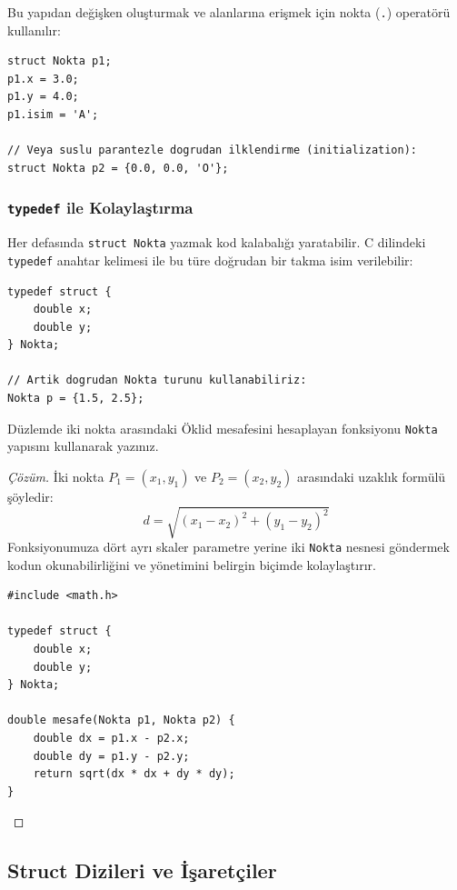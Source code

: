 Bu yapıdan değişken oluşturmak ve alanlarına erişmek için nokta (\lstinline|.|) operatörü kullanılır:
\begin{lstlisting}[language=CTemel]
struct Nokta p1;
p1.x = 3.0;
p1.y = 4.0;
p1.isim = 'A';

// Veya suslu parantezle dogrudan ilklendirme (initialization):
struct Nokta p2 = {0.0, 0.0, 'O'};
\end{lstlisting}

\subsubsection{\lstinline|typedef| ile Kolaylaştırma}
Her defasında \lstinline|struct Nokta| yazmak kod kalabalığı yaratabilir. C dilindeki \lstinline|typedef| anahtar kelimesi ile bu türe doğrudan bir takma isim verilebilir:
\begin{lstlisting}[language=CTemel]
typedef struct {
    double x;
    double y;
} Nokta;

// Artik dogrudan Nokta turunu kullanabiliriz:
Nokta p = {1.5, 2.5};
\end{lstlisting}

\begin{example}
Düzlemde iki nokta arasındaki Öklid mesafesini hesaplayan fonksiyonu \lstinline|Nokta| yapısını kullanarak yazınız.
\end{example}

\begin{proof}[Çözüm]
İki nokta $P_1 = (x_1, y_1)$ ve $P_2 = (x_2, y_2)$ arasındaki uzaklık formülü şöyledir:
\[
d = \sqrt{(x_1 - x_2)^2 + (y_1 - y_2)^2}
\]
Fonksiyonumuza dört ayrı skaler parametre yerine iki \lstinline|Nokta| nesnesi göndermek kodun okunabilirliğini ve yönetimini belirgin biçimde kolaylaştırır.

\begin{lstlisting}[language=CTemel]
#include <math.h>

typedef struct {
    double x;
    double y;
} Nokta;

double mesafe(Nokta p1, Nokta p2) {
    double dx = p1.x - p2.x;
    double dy = p1.y - p2.y;
    return sqrt(dx * dx + dy * dy);
}
\end{lstlisting}
\end{proof}

\subsection{Struct Dizileri ve İşaretçiler}

